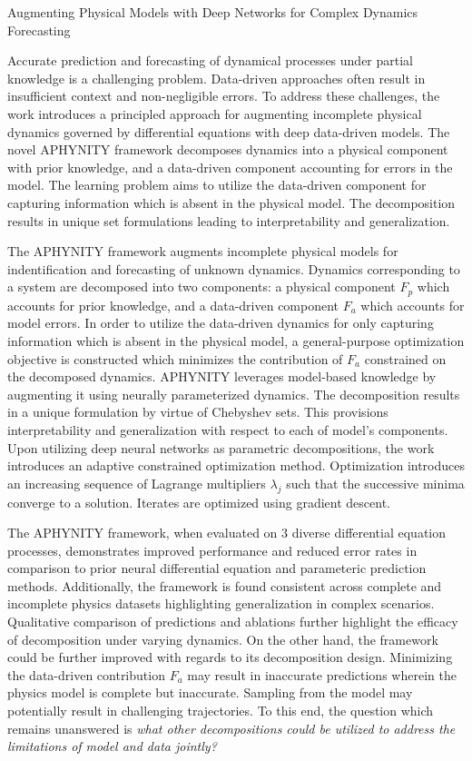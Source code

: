 \documentclass[11pt,letterpaper]{article}
\begin{document}
\begin{center}
  \large{Augmenting Physical Models with Deep Networks for Complex Dynamics Forecasting}
\end{center}

Accurate prediction and forecasting of dynamical processes under partial knowledge is a challenging problem. Data-driven approaches often result in insufficient context and non-negligible errors. To address these challenges, the work introduces a principled approach for augmenting incomplete physical dynamics governed by differential equations with deep data-driven models. The novel APHYNITY framework decomposes dynamics into a physical component with prior knowledge, and a data-driven component accounting for errors in the model. The learning problem aims to utilize the data-driven component for capturing information which is absent in the physical model. The decomposition results in unique set formulations leading to interpretability and generalization.

The APHYNITY framework augments incomplete physical models for indentification and forecasting of unknown dynamics. Dynamics corresponding to a system are decomposed into two components: a physical component $F_{p}$ which accounts for prior knowledge, and a data-driven component $F_{a}$ which accounts for model errors. In order to utilize the data-driven dynamics for only capturing information which is absent in the physical model, a general-purpose optimization objective is constructed which minimizes the contribution of $F_{a}$ constrained on the decomposed dynamics. APHYNITY leverages model-based knowledge by augmenting it using neurally parameterized dynamics. The decomposition results in a unique formulation by virtue of Chebyshev sets. This provisions interpretability and generalization with respect to each of model's components. Upon utilizing deep neural networks as parametric decompositions, the work introduces an adaptive constrained optimization method. Optimization introduces an increasing sequence of Lagrange multipliers $\lambda_{j}$ such that the successive minima converge to a solution. Iterates are optimized using gradient descent.

The APHYNITY framework, when evaluated on 3 diverse differential equation processes, demonstrates improved performance and reduced error rates in comparison to prior neural differential equation and parameteric prediction methods. Additionally, the framework is found consistent across complete and incomplete physics datasets highlighting generalization in complex scenarios. Qualitative comparison of predictions and ablations further highlight the efficacy of decomposition under varying dynamics. On the other hand, the framework could be further improved with regards to its decomposition design. Minimizing the data-driven contribution $F_{a}$ may result in inaccurate predictions wherein the physics model is complete but inaccurate. Sampling from the model may potentially result in challenging trajectories. To this end, the question which remains unanswered is \textit{what other decompositions could be utilized to address the limitations of model and data jointly?}
\end{document}
